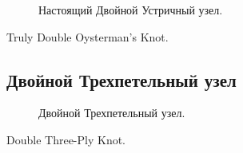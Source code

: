 \begin{figure}[H]\centering
	\begin{minipage}{1\linewidth}
		\begin{center}
			\tcbox[enhanced jigsaw,colframe=black,opacityframe=0.5,opacityback=0.5]
			{\centering{}}
		\end{center}
	\end{minipage}
\caption{Настоящий Двойной Устричный узел.}
\label{ris:Truly_Double_Oysterman}
\end{figure}

Truly Double Oysterman’s Knot.

\subsection{Двойной Трехпетельный узел}

\begin{figure}[H]\centering
	\begin{minipage}{1\linewidth}
		\begin{center}
			\tcbox[enhanced jigsaw,colframe=black,opacityframe=0.5,opacityback=0.5]
			{\centering{}}
		\end{center}
	\end{minipage}
\caption{Двойной Трехпетельный узел.}
\label{ris:Double_Three-Ply_Knot}
\end{figure}

Double Three-Ply Knot.
